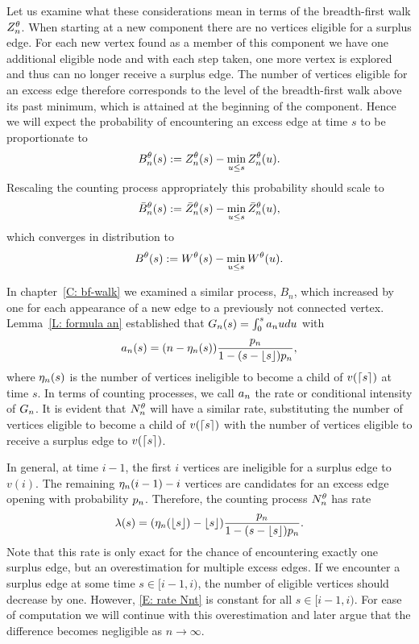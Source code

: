 Let us examine what these considerations mean in terms of the breadth-first walk $Z_n^{\theta}$.
When starting at a new component there are no vertices eligible for a surplus edge.
For each new vertex found as a member of this component we have one additional eligible node 
and with each step taken, one more vertex is explored and thus can no longer receive a surplus edge.
The number of vertices eligible for an excess edge therefore corresponds to the level of the breadth-first walk above its past minimum,
which is attained at the beginning of the component.
Hence we will expect the probability of encountering an excess edge at time $s$ to be proportionate to
\begin{equation}
B_n^{\theta}(s) := Z_n^{\theta}(s) - \min_{u \leq s}Z_n^{\theta}(u).
\end{equation}
Rescaling the counting process appropriately this probability should scale to
\begin{equation}
\bar{B}_n^{\theta}(s) := \bar{Z}^{\theta}_n(s) - \min_{u \leq s}\bar{Z}^{\theta}_n(u),
\end{equation}
which converges in distribution to
\begin{equation}
B^{\theta}(s) := W^{\theta}(s) - \min_{u \leq s}W^{\theta}(u). 
\end{equation}

In chapter~\ref{C: bf-walk} we examined a similar process, $B_n$, 
which increased by one for each appearance of a new edge to a previously not connected vertex.
Lemma~\ref{L: formula an} established that $G_n(s) = \int_{0}^{s} a_n{u}du$ with
\begin{equation*}
	a_n(s) = (n - \eta_n(s)) \frac{p_n}{1-(s-\lfloor s\rfloor)p_n},
\end{equation*}
where $\eta_n(s)$ is the number of vertices ineligible to become a child of $v(\lceil s\rceil)$ at time $s$.
In terms of counting processes, we call $a_n$ the rate or conditional intensity of $G_n$.
It is evident that $N_n^{\theta}$ will have a similar rate,
substituting the number of vertices eligible to become a child of $v(\lceil s\rceil)$ with the number of vertices eligible to receive a surplus edge to $v(\lceil s\rceil)$.

In general, at time $i-1$, the first $i$ vertices are ineligible for a surplus edge to $v(i)$.
The remaining $\eta_n(i-1) - i$ vertices are candidates for an excess edge opening with probability $p_n$.
Therefore, the counting process $N_n^{\theta}$ has rate
\begin{equation} \label{E: rate Nnt}
\lambda(s) = (\eta_n(\lfloor s\rfloor) - \lfloor s\rfloor) \frac{p_n}{1-(s-\lfloor s\rfloor)p_n}.
\end{equation}
Note that this rate is only exact for the chance of encountering exactly one surplus edge, 
but an overestimation for multiple excess edges.
If we encounter a surplus edge at some time $s \in [i-1, i)$,
the number of eligible vertices should decrease by one.
However, \eqref{E: rate Nnt} is constant for all $s \in [i-1, i)$.
For ease of computation we will continue with this overestimation and later argue that the difference becomes negligible as $n \rightarrow \infty$.

